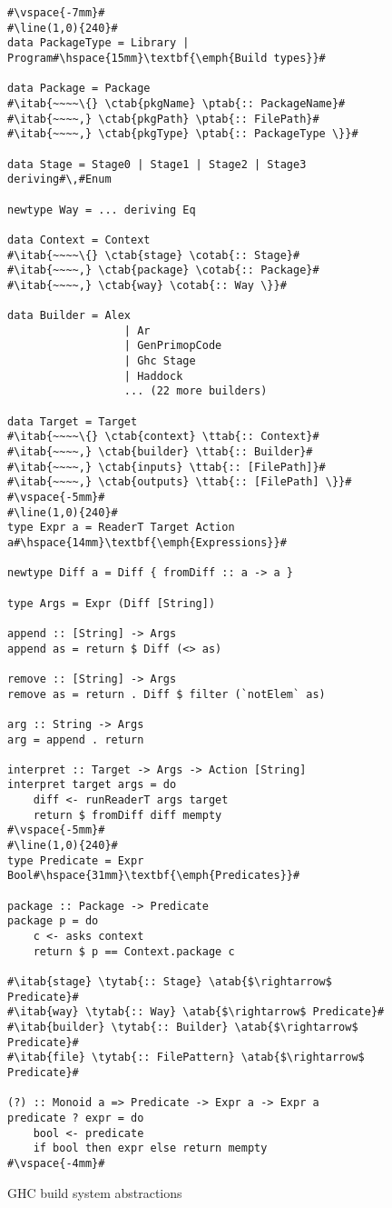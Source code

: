\begin{figure}
\begin{lstlisting}
#\vspace{-7mm}#
#\line(1,0){240}#
data PackageType = Library | Program#\hspace{15mm}\textbf{\emph{Build types}}#

data Package = Package
#\itab{~~~~\{} \ctab{pkgName} \ptab{:: PackageName}#
#\itab{~~~~,} \ctab{pkgPath} \ptab{:: FilePath}#
#\itab{~~~~,} \ctab{pkgType} \ptab{:: PackageType \}}#

data Stage = Stage0 | Stage1 | Stage2 | Stage3 deriving#\,#Enum

newtype Way = ... deriving Eq

data Context = Context
#\itab{~~~~\{} \ctab{stage} \cotab{:: Stage}#
#\itab{~~~~,} \ctab{package} \cotab{:: Package}#
#\itab{~~~~,} \ctab{way} \cotab{:: Way \}}#

data Builder = Alex
                  | Ar
                  | GenPrimopCode
                  | Ghc Stage
                  | Haddock
                  ... (22 more builders)

data Target = Target
#\itab{~~~~\{} \ctab{context} \ttab{:: Context}#
#\itab{~~~~,} \ctab{builder} \ttab{:: Builder}#
#\itab{~~~~,} \ctab{inputs} \ttab{:: [FilePath]}#
#\itab{~~~~,} \ctab{outputs} \ttab{:: [FilePath] \}}#
#\vspace{-5mm}#
#\line(1,0){240}#
type Expr a = ReaderT Target Action a#\hspace{14mm}\textbf{\emph{Expressions}}#

newtype Diff a = Diff { fromDiff :: a -> a }

type Args = Expr (Diff [String])

append :: [String] -> Args
append as = return $ Diff (<> as)

remove :: [String] -> Args
remove as = return . Diff $ filter (`notElem` as)

arg :: String -> Args
arg = append . return

interpret :: Target -> Args -> Action [String]
interpret target args = do
    diff <- runReaderT args target
    return $ fromDiff diff mempty
#\vspace{-5mm}#
#\line(1,0){240}#
type Predicate = Expr Bool#\hspace{31mm}\textbf{\emph{Predicates}}#

package :: Package -> Predicate
package p = do
    c <- asks context
    return $ p == Context.package c

#\itab{stage} \tytab{:: Stage} \atab{$\rightarrow$ Predicate}#
#\itab{way} \tytab{:: Way} \atab{$\rightarrow$ Predicate}#
#\itab{builder} \tytab{:: Builder} \atab{$\rightarrow$ Predicate}#
#\itab{file} \tytab{:: FilePattern} \atab{$\rightarrow$ Predicate}#

(?) :: Monoid a => Predicate -> Expr a -> Expr a
predicate ? expr = do
    bool <- predicate
    if bool then expr else return mempty
#\vspace{-4mm}#
\end{lstlisting}
\caption{GHC build system abstractions\label{fig:abstractions}}
\end{figure}

